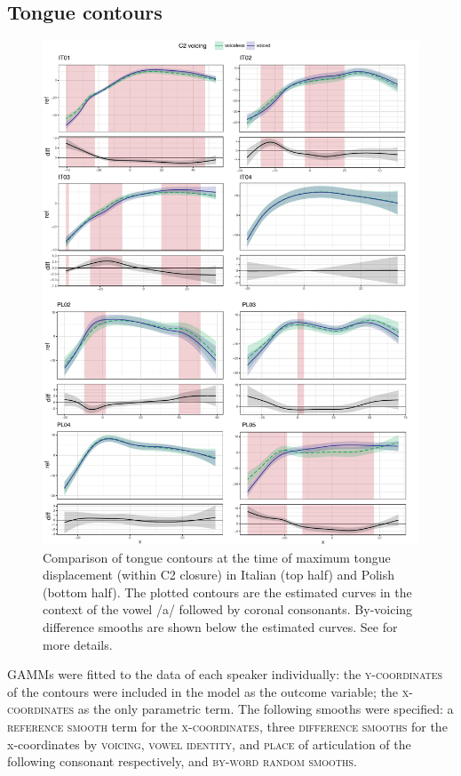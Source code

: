 \documentclass[authoryear, twocolumn]{elsarticle}
\begin{document}
\subsection{Tongue contours}\label{tongue-contours}

\label{s:splines}

\begin{figure}
    \centering
    \includegraphics[height=.9\textheight]{fig/tra-colour.pdf}
    \caption{Comparison of tongue contours at the time of maximum tongue displacement (within C2 closure) in Italian (top half) and Polish (bottom half). The plotted contours are the estimated curves in the context of the vowel /a/ followed by coronal consonants. By-voicing difference smooths are shown below the estimated curves. See  for more details.}
    \label{f:tra}
\end{figure}

GAMMs were fitted to the data of each speaker individually: the
\textsc{y-coordinates} of the contours were included in the model as the
outcome variable; the \textsc{x-coordinates} as the only parametric
term. The following smooths were specified: a \textsc{reference smooth}
term for the \textsc{x-coordinates}, three \textsc{difference smooths}
for the x-coordinates by \textsc{voicing}, \textsc{vowel identity}, and
\textsc{place} of articulation of the following consonant respectively,
and \textsc{by-word random smooths}.
\end{document}
